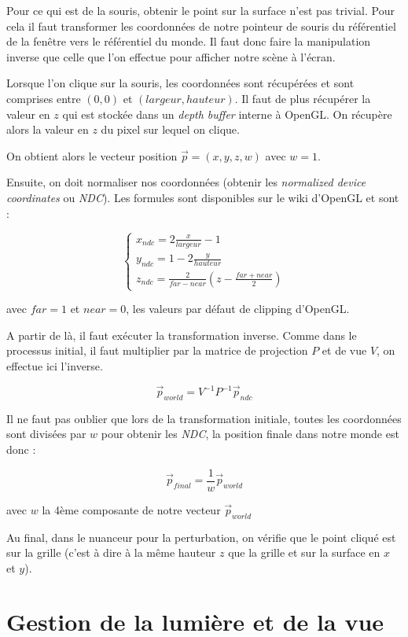 \documentclass[a4paper,11pt,leqno]{article}
\begin{document}
Pour ce qui est de la souris, obtenir le point sur la surface n'est pas trivial. Pour cela il faut transformer les coordonnées de notre pointeur de souris du référentiel de la fenêtre vers le référentiel du monde. Il faut donc faire la manipulation inverse que celle que l'on effectue pour afficher notre scène à l'écran.

Lorsque l'on clique sur la souris, les coordonnées sont récupérées et sont comprises entre $(0, 0)$ et $(largeur, hauteur)$. Il faut de plus récupérer la valeur en $z$ qui est stockée dans un \emph{depth buffer} interne à OpenGL. On récupère alors la valeur en $z$ du pixel sur lequel on clique.

On obtient alors le vecteur position $\overrightarrow{p} = (x,y,z,w)$ avec $w=1$.

Ensuite, on doit normaliser nos coordonnées (obtenir les \emph{normalized device coordinates} ou \emph{NDC}). Les formules sont disponibles sur le wiki d'OpenGL et sont :

\[
\begin{cases}
	x_{ndc} = 2\frac{x}{largeur} - 1\\
	y_{ndc} = 1 - 2 \frac{y}{hauteur}\\
	z_{ndc} = \frac{2}{far - near}( z - \frac{far + near}{2})
\end{cases}
\]

avec $far = 1$ et $near = 0$, les valeurs par défaut de clipping d'OpenGL.

A partir de là, il faut exécuter la transformation inverse. Comme dans le processus initial, il faut multiplier par la matrice de projection $P$ et de vue $V$, on effectue ici l'inverse.

\[
	\overrightarrow{p}_{world} = V^{-1}P^{-1} \overrightarrow{p}_{ndc}
\]

Il ne faut pas oublier que lors de la transformation initiale, toutes les coordonnées sont divisées par $w$ pour obtenir les \emph{NDC}, la position finale dans notre monde est donc :

\[
	\overrightarrow{p}_{final} = \frac{1}{w} \overrightarrow{p}_{world}
\]

avec $w$ la 4ème composante de notre vecteur $\overrightarrow{p}_{world}$

Au final, dans le nuanceur pour la perturbation, on vérifie que le point cliqué est sur la grille (c'est à dire à la même hauteur $z$ que la grille et sur la surface en $x$ et $y$).

\section{Gestion de la lumière et de la vue}
\end{document}
